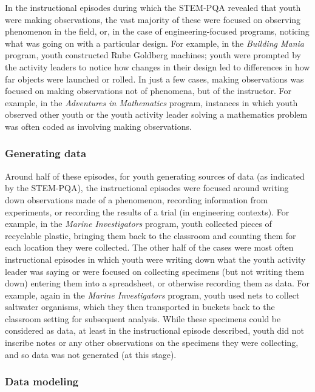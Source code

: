 \documentclass[]{book}
\theoremstyle{definition}
\theoremstyle{definition}
\theoremstyle{definition}
\theoremstyle{remark}
\begin{document}
In the instructional episodes during which the STEM-PQA revealed that
youth were making observations, the vast majority of these were focused
on observing phenomenon in the field, or, in the case of
engineering-focused programs, noticing what was going on with a
particular design. For example, in the \emph{Building Mania} program,
youth constructed Rube Goldberg machines; youth were prompted by the
activity leaders to notice how changes in their design led to
differences in how far objects were launched or rolled. In just a few
cases, making observations was focused on making observations not of
phenomena, but of the instructor. For example, in the \emph{Adventures
in Mathematics} program, instances in which youth observed other youth
or the youth activity leader solving a mathematics problem was often
coded as involving making observations.

\subsubsection{Generating data}\label{generating-data}

Around half of these episodes, for youth generating sources of data (as
indicated by the STEM-PQA), the instructional episodes were focused
around writing down observations made of a phenomenon, recording
information from experiments, or recording the results of a trial (in
engineering contexts). For example, in the \emph{Marine Investigators}
program, youth collected pieces of recyclable plastic, bringing them
back to the classroom and counting them for each location they were
collected. The other half of the cases were most often instructional
episodes in which youth were writing down what the youth activity leader
was saying or were focused on collecting specimens (but not writing them
down) entering them into a spreadsheet, or otherwise recording them as
data. For example, again in the \emph{Marine Investigators} program,
youth used nets to collect saltwater organisms, which they then
transported in buckets back to the classroom setting for subsequent
analysis. While these specimens could be considered as data, at least in
the instructional episode described, youth did not inscribe notes or any
other observations on the specimens they were collecting, and so data
was not generated (at this stage).

\subsubsection{Data modeling}\label{data-modeling}
\end{document}
